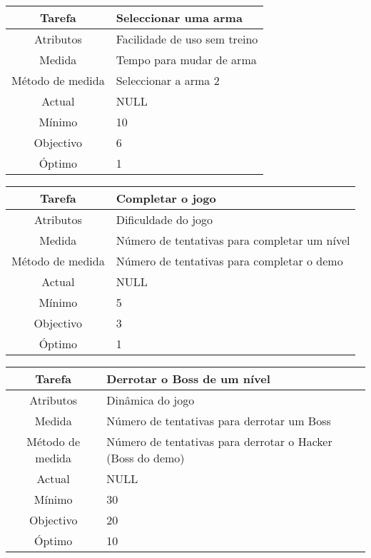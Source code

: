 \begin{center}
	\begin{tabular} {|c|p{10cm}|}
		\hline
		Tarefa & Seleccionar uma arma \\
		\hline
		Atributos & Facilidade de uso sem treino \\
		\hline
		Medida & Tempo para mudar de arma \\
		\hline
		Método de medida & Seleccionar a arma 2 \\
		\hline
		Actual & NULL \\
		Mínimo & 10 \\
		Objectivo & 6 \\
		Óptimo & 1 \\
		\hline
	\end{tabular}
\end{center}

\begin{center}
	\begin{tabular} {|c|p{10cm}|}
		\hline
		Tarefa & Completar o jogo \\
		\hline
		Atributos & Dificuldade do jogo \\
		\hline
		Medida & Número de tentativas para completar um nível \\
		\hline
		Método de medida & Número de tentativas para completar o demo \\
		\hline
		Actual & NULL \\
		Mínimo & 5 \\
		Objectivo & 3 \\
		Óptimo & 1 \\
		\hline
	\end{tabular}
\end{center}

\begin{center}
	\begin{tabular} {|c|p{10cm}|}
		\hline
		Tarefa & Derrotar o Boss de um nível \\
		\hline
		Atributos & Dinâmica do jogo \\
		\hline
		Medida & Número de tentativas para derrotar um Boss \\
		\hline
		Método de medida & Número de tentativas para derrotar o Hacker (Boss do demo) \\
		\hline
		Actual & NULL \\
		Mínimo & 30 \\
		Objectivo & 20 \\
		Óptimo & 10 \\
		\hline
	\end{tabular}
\end{center}